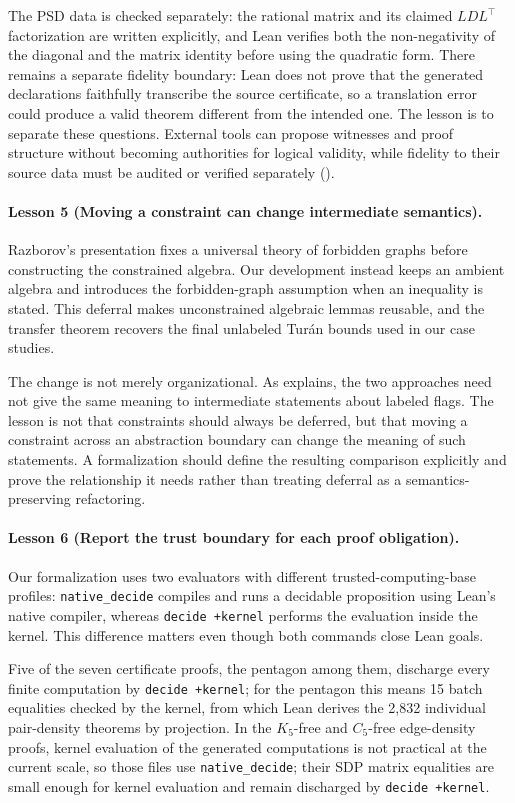 \documentclass{article}
\newcommand{\lean}[1]{\texttt{#1}}
\begin{document}
{The PSD data is checked separately: the rational matrix and its claimed
$LDL^\top$ factorization are written explicitly, and Lean verifies both the
non-negativity of the diagonal and the matrix identity before using the
quadratic form.  There remains a separate fidelity boundary: Lean does not
prove that the generated declarations faithfully transcribe the source
certificate, so a translation error could produce a valid theorem different
from the intended one.  The lesson is to separate these questions.  External
tools can propose witnesses and proof structure without becoming authorities
for logical validity, while fidelity to their source data must be audited or
verified separately ().

\paragraph{Lesson 5 (Moving a constraint can change intermediate semantics).}
Razborov's presentation fixes a universal theory of forbidden graphs before
constructing the constrained algebra.  Our development instead keeps an
ambient algebra and introduces the forbidden-graph assumption when an
inequality is stated.  This deferral makes unconstrained algebraic lemmas
reusable, and the transfer theorem recovers the final unlabeled Tur\'an bounds
used in our case studies.

The change is not merely organizational.  As  explains,
the two approaches need not give the same meaning to intermediate statements
about labeled flags.  The lesson is not that constraints should always be
deferred, but that moving a constraint across an abstraction boundary can
change the meaning of such statements.  A formalization should define the
resulting comparison explicitly and prove the relationship it needs rather
than treating deferral as a semantics-preserving refactoring.

\paragraph{Lesson 6 (Report the trust boundary for each proof obligation).}
Our formalization uses two evaluators with different trusted-computing-base
profiles:
\lean{native\_decide} compiles and runs a decidable proposition using Lean's
native compiler, whereas \lean{decide +kernel} performs the evaluation inside
the kernel.  This difference matters even though both commands close Lean
goals.

Five of the seven certificate proofs, the pentagon among them, discharge
every finite computation by \lean{decide +kernel}; for the pentagon this
means 15 batch equalities checked by the kernel, from which Lean derives the
2,832 individual pair-density theorems by projection.  In the $K_5$-free and
$C_5$-free edge-density proofs, kernel evaluation of the generated
computations is not practical at the current scale, so those files use
\lean{native\_decide}; their SDP matrix equalities are small enough for
kernel evaluation and remain discharged by \lean{decide +kernel}.

}
\end{document}
